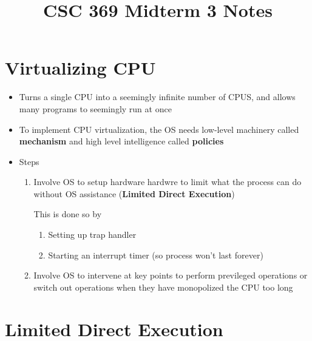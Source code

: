 \documentclass[12pt]{article}
\begin{document}
\title{CSC 369 Midterm 3 Notes}

\section{Virtualizing CPU}

\begin{itemize}
    \item Turns a single CPU into a seemingly infinite number of CPUS, and
    allows many programs to seemingly run at once
    \item To implement CPU virtualization, the OS needs low-level machinery
    called \textbf{mechanism} and high level intelligence called \textbf{policies}
    \item Steps

    \begin{enumerate}[1.]
        \item Involve OS to setup hardware hardwre to limit what the process can do without OS assistance
        (\textbf{Limited Direct Execution})

        \bigskip

        This is done so by

        \bigskip

        \begin{enumerate}[1.]
            \item Setting up trap handler
            \item Starting an interrupt timer (so process won't last forever)
        \end{enumerate}
        \item Involve OS to intervene at key points to perform previleged operations
        or switch out operations when they have monopolized the CPU too long
    \end{enumerate}
    \bigskip
\end{itemize}

\section{Limited Direct Execution}
\end{document}
